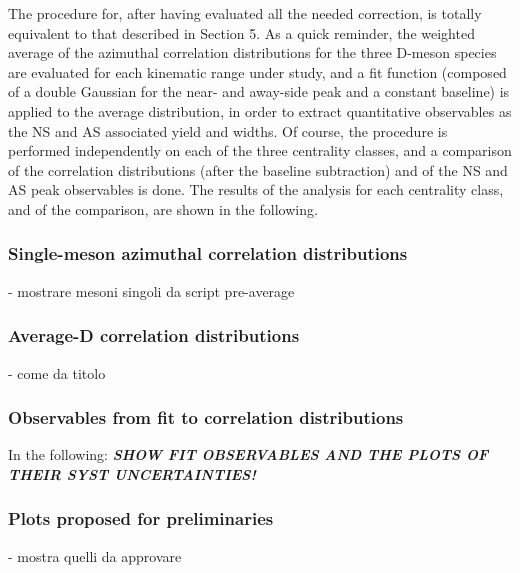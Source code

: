 The procedure for, after having evaluated all the needed correction, is totally equivalent to that described in Section 5.
As a quick reminder, the weighted average of the azimuthal correlation distributions for the three D-meson species are evaluated for each kinematic range under study, and a fit function (composed of a double Gaussian for the near- and away-side peak and a constant baseline) is applied to the average distribution, in order to extract quantitative observables as the NS and AS associated yield and widths.
Of course, the procedure is performed independently on each of the three centrality classes, and a comparison of the correlation distributions (after the baseline subtraction) and of the NS and AS peak observables is done.
The results of the analysis for each centrality class, and of the comparison, are shown in the following.

\subsubsection{Single-meson azimuthal correlation distributions}
- mostrare mesoni singoli da script pre-average

\subsubsection{Average-D correlation distributions}
- come da titolo

\subsubsection{Observables from fit to correlation distributions}


In the following:
\textit{\textbf{SHOW FIT OBSERVABLES AND THE PLOTS OF THEIR SYST UNCERTAINTIES!}}

\subsubsection{Plots proposed for preliminaries}
- mostra quelli da approvare 
